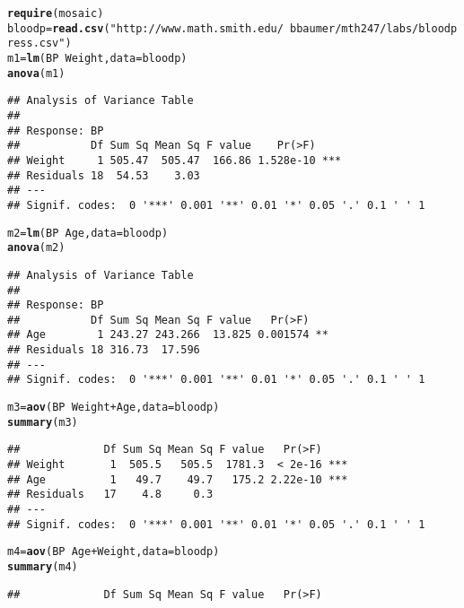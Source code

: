 \documentclass[10pt]{article}\usepackage[]{graphicx}\usepackage[]{color}
\makeatletter
\newcommand{\hlstr}[1]{\textcolor[rgb]{0.192,0.494,0.8}{#1}}%
\newcommand{\hlopt}[1]{\textcolor[rgb]{0,0,0}{#1}}%
\newcommand{\hlstd}[1]{\textcolor[rgb]{0.345,0.345,0.345}{#1}}%
\newcommand{\hlkwb}[1]{\textcolor[rgb]{0.69,0.353,0.396}{#1}}%
\newcommand{\hlkwc}[1]{\textcolor[rgb]{0.333,0.667,0.333}{#1}}%
\newcommand{\hlkwd}[1]{\textcolor[rgb]{0.737,0.353,0.396}{\textbf{#1}}}%
\newenvironment{kframe}{%
 \def\at@end@of@kframe{}%
 \ifinner\ifhmode%
  \def\at@end@of@kframe{\end{minipage}}%
  \begin{minipage}{\columnwidth}%
 \fi\fi%
 \def\FrameCommand##1{\hskip\@totalleftmargin \hskip-\fboxsep
 \colorbox{shadecolor}{##1}\hskip-\fboxsep
     \hskip-\linewidth \hskip-\@totalleftmargin \hskip\columnwidth}%
 \MakeFramed {\advance\hsize-\width
   \@totalleftmargin\z@ \linewidth\hsize
   \@setminipage}}%
 {\par\unskip\endMakeFramed%
 \at@end@of@kframe}
\newenvironment{knitrout}{}{} %
\makeatother
\begin{document}
\begin{knitrout}
\color{fgcolor}\begin{kframe}
\begin{alltt}
\hlkwd{require}\hlstd{(mosaic)}
\hlstd{bloodp} \hlkwb{=} \hlkwd{read.csv}\hlstd{(}\hlstr{"http://www.math.smith.edu/~bbaumer/mth247/labs/bloodpress.csv"}\hlstd{)}
\hlstd{m1} \hlkwb{=} \hlkwd{lm}\hlstd{(BP} \hlopt{~} \hlstd{Weight,} \hlkwc{data}\hlstd{=bloodp)}
\hlkwd{anova}\hlstd{(m1)}
\end{alltt}
\begin{verbatim}
## Analysis of Variance Table
## 
## Response: BP
##           Df Sum Sq Mean Sq F value    Pr(>F)    
## Weight     1 505.47  505.47  166.86 1.528e-10 ***
## Residuals 18  54.53    3.03                      
## ---
## Signif. codes:  0 '***' 0.001 '**' 0.01 '*' 0.05 '.' 0.1 ' ' 1
\end{verbatim}
\begin{alltt}
\hlstd{m2} \hlkwb{=} \hlkwd{lm}\hlstd{(BP} \hlopt{~} \hlstd{Age,} \hlkwc{data}\hlstd{=bloodp)}
\hlkwd{anova}\hlstd{(m2)}
\end{alltt}
\begin{verbatim}
## Analysis of Variance Table
## 
## Response: BP
##           Df Sum Sq Mean Sq F value   Pr(>F)   
## Age        1 243.27 243.266  13.825 0.001574 **
## Residuals 18 316.73  17.596                    
## ---
## Signif. codes:  0 '***' 0.001 '**' 0.01 '*' 0.05 '.' 0.1 ' ' 1
\end{verbatim}
\begin{alltt}
\hlstd{m3} \hlkwb{=} \hlkwd{aov}\hlstd{(BP}\hlopt{~} \hlstd{Weight} \hlopt{+} \hlstd{Age,} \hlkwc{data}\hlstd{=bloodp)}
\hlkwd{summary}\hlstd{(m3)}
\end{alltt}
\begin{verbatim}
##             Df Sum Sq Mean Sq F value   Pr(>F)    
## Weight       1  505.5   505.5  1781.3  < 2e-16 ***
## Age          1   49.7    49.7   175.2 2.22e-10 ***
## Residuals   17    4.8     0.3                     
## ---
## Signif. codes:  0 '***' 0.001 '**' 0.01 '*' 0.05 '.' 0.1 ' ' 1
\end{verbatim}
\begin{alltt}
\hlstd{m4} \hlkwb{=} \hlkwd{aov}\hlstd{(BP}\hlopt{~} \hlstd{Age} \hlopt{+}  \hlstd{Weight,} \hlkwc{data}\hlstd{=bloodp)}
\hlkwd{summary}\hlstd{(m4)}
\end{alltt}
\begin{verbatim}
##             Df Sum Sq Mean Sq F value   Pr(>F)    

\end{verbatim}
\end{kframe}
\end{knitrout}
\end{document}
